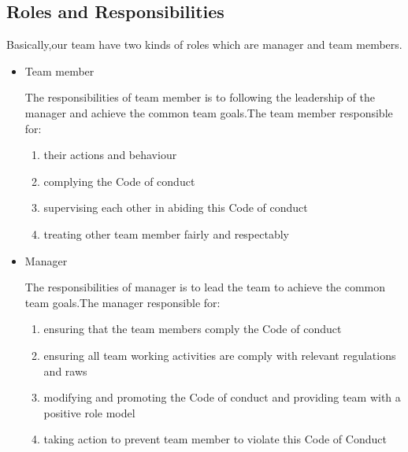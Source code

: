 \documentclass[11pt]{article}
\begin{document}
\subsection{Roles and Responsibilities}
Basically,our team have two kinds of roles which are manager and team members.
	\begin{itemize}
		 \item Team member 
		 \par\setlength\parindent{2em}The responsibilities of team member is to following the leadership of the manager and achieve the common team goals.The team member responsible for:
		 \begin{enumerate}
		 	\item their actions and behaviour
		 	\item complying the Code of conduct
		 	\item supervising each other in abiding this Code of conduct
		 	\item treating other team member fairly and respectably
		 \end{enumerate}	
 \item Manager 
 \par\setlength\parindent{2em}The responsibilities of manager is to lead the team to achieve the common team goals.The manager responsible for:
 	\begin{enumerate}
  		\item ensuring that the team members comply the Code of conduct
  		     \item ensuring all team working activities are comply with relevant regulations and raws
  			\item modifying and promoting the Code of conduct and providing team with a positive role model	
  		\item taking action to prevent team member to violate this Code of Conduct
 \end{enumerate}	

   
\end{itemize}
 
\end{document}

